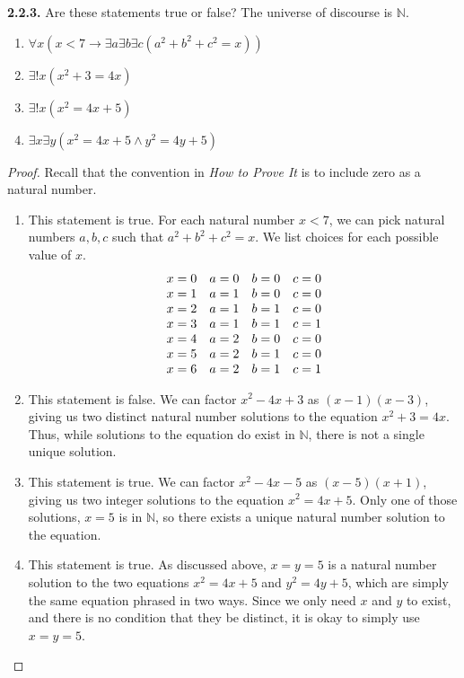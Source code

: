 \documentclass[12pt]{amsart}
\newenvironment{statement}[1]{\smallskip\noindent\color[rgb]{.6627, .3529, .6314} {\bf #1.}}{}
\theoremstyle{definition}
\theoremstyle{remark}
\newcommand{\BN}{\mathbb N}
\begin{document}
\begin{statement}{2.2.3}
Are these statements true or false?
The universe of discourse is $\BN$.
\begin{enumerate}
	\item $\forall x (x < 7 \rightarrow \exists a \exists b \exists c (a^2 + b^2 + c^2 = x))$
	
	\item $\exists! x (x^2 + 3 = 4x)$
	
	\item $\exists! x (x^2 = 4x + 5)$
	
	\item $\exists x \exists y (x^2 = 4x + 5 \wedge y^2 = 4y + 5)$
\end{enumerate}
\end{statement}

\begin{proof}
Recall that the convention in \emph{How to Prove It} is to include zero as a natural number.
\begin{enumerate}
	\item This statement is true.
	For each natural number $x < 7$, we can pick natural numbers $a, b, c$ such that $a^2 + b^2 + c^2 = x$.
	We list choices for each possible value of $x$.
	\begin{equation*}
		\begin{array}{c c c c}
			x = 0 & a = 0 & b = 0 & c = 0 \\
			x = 1 & a = 1 & b = 0 & c = 0 \\
			x = 2 & a = 1 & b = 1 & c = 0 \\
			x = 3 & a = 1 & b = 1 & c = 1 \\
			x = 4 & a = 2 & b = 0 & c = 0 \\
			x = 5 & a = 2 & b = 1 & c = 0 \\
			x = 6 & a = 2 & b = 1 & c = 1
		\end{array}
	\end{equation*}
	
	\item This statement is false.
	We can factor $x^2 - 4x + 3$ as $(x - 1)(x - 3)$, giving us two distinct natural number
	solutions to the equation $x^2 + 3 = 4x$.
	Thus, while solutions to the equation do exist in $\BN$, there is not a single unique solution.
	
	\item This statement is true.
	We can factor $x^2 - 4x - 5$ as $(x - 5)(x + 1)$, giving us two integer solutions
	to the equation $x^2 = 4x + 5$.
	Only one of those solutions, $x = 5$ is in $\BN$, so there exists a unique natural number
	solution to the equation.
	
	\item This statement is true.
	As discussed above, $x = y = 5$ is a natural number solution to the two equations
	$x^2 = 4x + 5$ and $y^2 = 4y + 5$, which are simply the same equation phrased in two ways.
	Since we only need $x$ and $y$ to exist, and there is no condition that they be distinct,
	it is okay to simply use $x = y = 5$.
\end{enumerate}
\end{proof}
\end{document}

